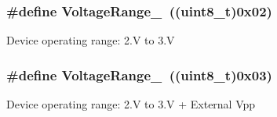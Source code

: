 \subsubsection[{Voltage\+Range\+\_\+3}]{\setlength{\rightskip}{0pt plus 5cm}\#define Voltage\+Range\+\_~((uint8\+\_\+t)0x02)}\label{group___f_l_a_s_h___voltage___range_gadd249fb08c69b11cea3a6b7c22865b99}
Device operating range\+: 2.\+V to 3.\+V \hypertarget{group___f_l_a_s_h___voltage___range_ga3197950f6bfefc8b9a784db5439a0498}{}
\subsubsection[{Voltage\+Range\+\_\+4}]{\setlength{\rightskip}{0pt plus 5cm}\#define Voltage\+Range\+\_~((uint8\+\_\+t)0x03)}\label{group___f_l_a_s_h___voltage___range_ga3197950f6bfefc8b9a784db5439a0498}
Device operating range\+: 2.\+V to 3.\+V + External Vpp 